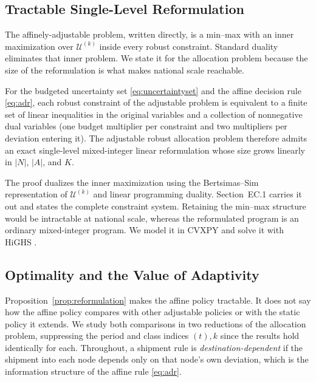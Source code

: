 \documentclass[11pt]{article}
\begin{document}
\subsection{Tractable Single-Level Reformulation}
\label{sec:reformulation}

The affinely-adjustable problem, written directly, is a min--max with an inner maximization over $\mathcal{U}^{(k)}$ inside every robust constraint.
Standard duality eliminates that inner problem.
We state it for the allocation problem because the size of the reformulation is what makes national scale reachable.

\begin{proposition}
\label{prop:reformulation}
For the budgeted uncertainty set \eqref{eq:uncertaintyset} and the affine decision rule \eqref{eq:adr}, each robust constraint of the adjustable problem is equivalent to a finite set of linear inequalities in the original variables and a collection of nonnegative dual variables (one budget multiplier per constraint and two multipliers per deviation entering it).
The adjustable robust allocation problem therefore admits an exact single-level mixed-integer linear reformulation whose size grows linearly in $|N|$, $|A|$, and $K$.
\end{proposition}

The proof dualizes the inner maximization using the Bertsimas--Sim representation of $\mathcal{U}^{(k)}$ and linear programming duality.
Section~EC.1 carries it out and states the complete constraint system.
Retaining the min--max structure would be intractable at national scale, whereas the reformulated program is an ordinary mixed-integer program.
We model it in CVXPY \citep{cvxpy} and solve it with HiGHS \citep{highs}.

\subsection{Optimality and the Value of Adaptivity}
\label{sec:exactness}

Proposition~\ref{prop:reformulation} makes the affine policy tractable.
It does not say how the affine policy compares with other adjustable policies or with the static policy it extends.
We study both comparisons in two reductions of the allocation problem, suppressing the period and class indices $(t), k$ since the results hold identically for each.
Throughout, a shipment rule is \emph{destination-dependent} if the shipment into each node depends only on that node's own deviation, which is the information structure of the affine rule \eqref{eq:adr}.
\end{document}
